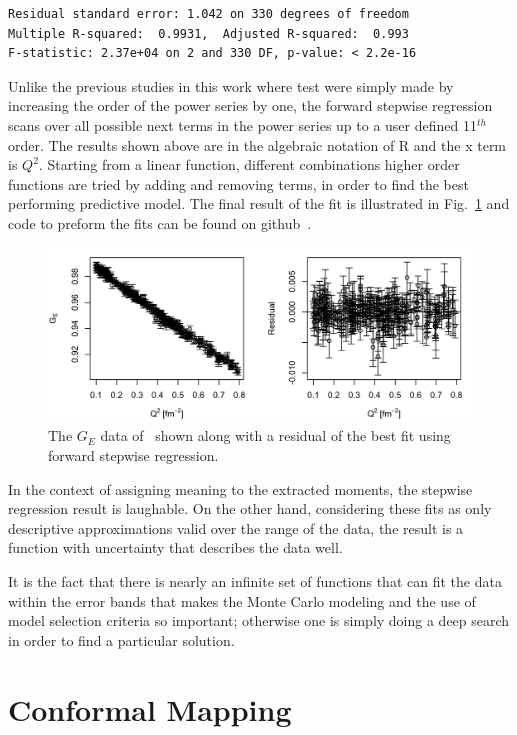 \documentclass[10pt,superscriptaddress,aps,prc,twocolumn]{revtex4-1}
\begin{document}
\begin{appendix}
\begin{Verbatim}[fontsize=\footnotesize]
Residual standard error: 1.042 on 330 degrees of freedom
Multiple R-squared:  0.9931,  Adjusted R-squared:  0.993 
F-statistic: 2.37e+04 on 2 and 330 DF, p-value: < 2.2e-16

\end{Verbatim}

Unlike the previous studies in this work where test were simply made by increasing the order of the power series
by one, the forward stepwise regression scans over all possible next
terms in the power series up to a user defined 11$^{th}$ order.     The results shown above are in the algebraic 
notation of R and the x term is $Q^2$.   Starting from a linear function, different combinations higher order functions
are tried by adding and removing terms, in order to find the best performing predictive model.   The final result
of the fit is illustrated in Fig.~\ref{R-stepwise} and code to preform the fits can be found on github~\cite{Higinbotham:2016github}.

\begin{figure}[htb]
\includegraphics[width=\columnwidth]{Figure/R-stepwise.png}
\caption{The $G_E$ data of~\cite{Griffioen:2015hta} shown along with a residual of the best fit using forward stepwise regression.}
\label{R-stepwise}
\end{figure}

In the context of assigning meaning to the extracted moments, the stepwise regression result is laughable.
On the other hand, considering these fits as only descriptive approximations valid over the range of the data,
the result is a function with uncertainty that describes the data well.

It is the fact that there is nearly an infinite set of functions that can fit the data within the 
error bands that makes the Monte Carlo modeling and the use of model selection criteria so important; otherwise
one is simply doing a deep search in order to find a particular solution. 

\section{Conformal Mapping}


\end{appendix}
\end{document}
